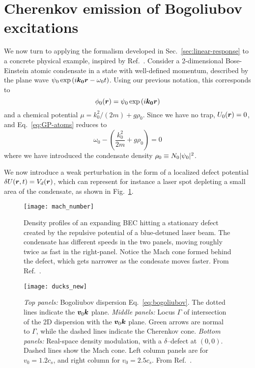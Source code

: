 \section{Cherenkov emission of Bogoliubov excitations}
\label{sec:cherenkov-emission}


We now turn to applying the formalism developed in
Sec.~\ref{sec:linear-response} to a concrete physical example,
inspired by Ref.~\cite{Carusotto_2006}. Consider a 2-dimensional
Bose-Einstein atomic condensate in a state with well-defined momentum,
described by the plane wave
$\psi_0 \exp \left( i \bm{k_0} \bm{r} - \omega_0 t \right)$. Using our
previous notation, this corresponds to
%
\begin{equation}\label{eq:atom-initial}
  \phi_0(\bm{r}) = \psi_0 \exp \left( i \bm{k_0} \bm{r} \right)
\end{equation}
% 
and a chemical potential $\mu = k_0^2/(2m) + g \rho_0$. Since we
have no trap, $U_0(\bm{r})=0$, and Eq.~\eqref{eq:GP-atoms} reduces to
%
\begin{equation}\label{eq:atom-MF}
  \omega_0 - \left( \frac{k_0^2}{2m} + g \rho_0 \right) = 0
\end{equation}
% 
where we have introduced the condensate density
$\rho_0 \equiv N_0 \vert \psi_0 \vert^2$.  

We now introduce a weak perturbation in the form of a localized defect
potential $\delta U(\bm{r}, t) = V_d(\bm{r})$, which can represent for
instance a laser spot depleting a small area of the condensate, as
shown in Fig.~\ref{fig:mach-number}.
%
\begin{figure}[tb]\centering
  \texttt{[image: mach\_number]}
  \caption{
    Density profiles of an expanding BEC hitting a stationary defect
created by the repulsive potential of a blue-detuned laser beam. The
condensate has different speeds in the two panels, moving roughly
twice as fast in the right-panel. Notice the Mach cone formed behind
the defect, which gets narrower as the condesate moves faster. From
Ref.~\cite{Carusotto_2006}.
}\label{fig:mach-number}
\end{figure}
% 
\begin{figure}[tb]\centering
  \texttt{[image: ducks\_new]}
  \caption{
    \emph{Top panels:} Bogoliubov dispersion
Eq.~\eqref{eq:bogoliubov}. The dotted lines indicate the $\bm{v}_0
\bm{k}$ plane.
    \emph{Middle panels:} Locus $\Gamma$ of intersection of the 2D
dispersion with the $\bm{v}_0 \bm{k}$ plane. Green arrows are normal
to $\Gamma$, while the dashed lines indicate the Cherenkov
cone.
    \emph{Bottom panels:} Real-space density modulation, with a
$\delta$--defect at $(0,0)$. Dashed lines show the Mach cone. Left
column panels are for $v_0 = 1.2 c_s$, and right column for $v_0 = 2.5
c_s$. From Ref.~\cite{9783319002651}.
}\label{fig:bogo-cherenkov}
\end{figure}


